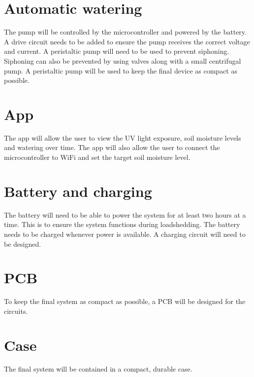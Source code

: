 \section{Automatic watering}
The pump will be controlled by the microcontroller and powered by the battery. A drive circuit needs to be added to ensure the pump receives the correct voltage and current. A peristaltic pump will need to be used to prevent siphoning. Siphoning can also be prevented by using valves along with a small centrifugal pump. A peristaltic pump will be used to keep the final device as compact as possible. 

\section{App}
The app will allow the user to view the UV light exposure, soil moisture levels and watering over time. The app will also allow the user to connect the microcontroller to WiFi and set the target soil moisture level. 

\section{Battery and charging}
The battery will need to be able to power the system for at least two hours at a time. This is to ensure the system functions during loadshedding. The battery needs to be charged whenever power is available. A charging circuit will need to be designed.


\section{PCB}
To keep the final system as compact as possible, a PCB will be designed for the circuits.

\section{Case}
The final system will be contained in a compact, durable case.